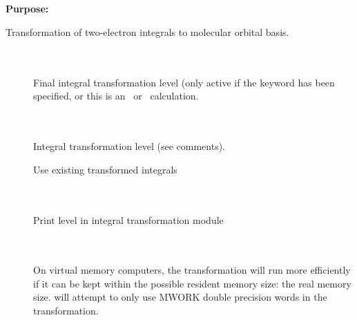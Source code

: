 \pagebreak[3]
\subsection{\label{ref-trainp}}

{\bf Purpose:}

Transformation of two-electron
integrals to molecular orbital
basis.

\begin{description}
\item[] \ \\
   \\
  Final integral transformation level (only active if the keyword
   has been specified, or this is an \aba\ or
  \resp\ calculation.

\item[] \ \\
   \\
  Integral transformation level (see comments).

\item[]
  Use existing transformed integrals

\item[] \ \\
   \\
  Print level in integral transformation module

\item[] \ \\
   \\
  On virtual memory computers, the transformation will run more
  efficiently if it can be kept within the possible resident memory
  size: the real memory size.  {\sir} will attempt to only use MWORK
  double precision words in the transformation.
\end{description}



